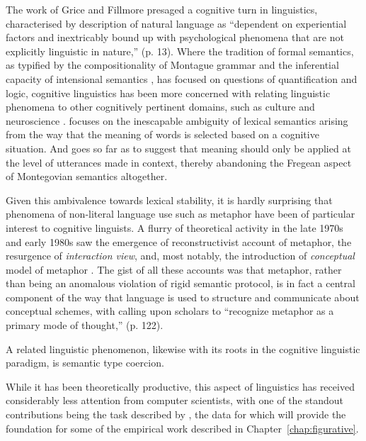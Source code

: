 The work of Grice and Fillmore presaged a cognitive turn in linguistics, characterised by  description of natural language as ``dependent on experiential factors and inextricably bound up with psychological phenomena that are not explicitly linguistic in nature,'' (p. 13).  Where the tradition of formal semantics, as typified by the compositionality of Montague grammar \citep{Cooper} and the inferential capacity of intensional semantics \citep{FoxEA2005}, has focused on questions of quantification and logic, cognitive linguistics has been more concerned with relating linguistic phenomena to other cognitively pertinent domains, such as culture \citep{Lakoff1987} and neuroscience \cite{Feldman2006}.  \cite{Sweetser1990} focuses on the inescapable ambiguity of lexical semantics arising from the way that the meaning of words is selected based on a cognitive situation.  And \cite{Evans2009} goes so far as to suggest that meaning should only be applied at the level of utterances made in context, thereby abandoning the Fregean aspect of Montegovian semantics \citep{Dummett1981} altogether.

Given this ambivalence towards lexical stability, it is hardly surprising that phenomena of non-literal language use such as metaphor have been of particular interest to cognitive linguists.  A flurry of theoretical activity in the late 1970s and early 1980s saw the emergence of  reconstructivist account of metaphor, the resurgence of  \emph{interaction view},  and, most notably, the introduction of  \emph{conceptual} model of metaphor \citep[see][for a valuable compendium]{Ortony1993}.  The gist of all these accounts was that metaphor, rather than being an anomalous violation of rigid semantic protocol, is in fact a central component of the way that language is used to structure and communicate about conceptual schemes, with \cite{Gibbs1994} calling upon scholars to ``recognize metaphor as a primary mode of thought,'' (p. 122).

A related linguistic phenomenon, likewise with its roots in the cognitive linguistic paradigm, is semantic type coercion.

While it has been theoretically productive, this aspect of linguistics has received considerably less attention from computer scientists, with one of the standout contributions being the task described by \cite{PustejovskyEA2010}, the data for which will provide the foundation for some of the empirical work described in Chapter~\ref{chap:figurative}.

